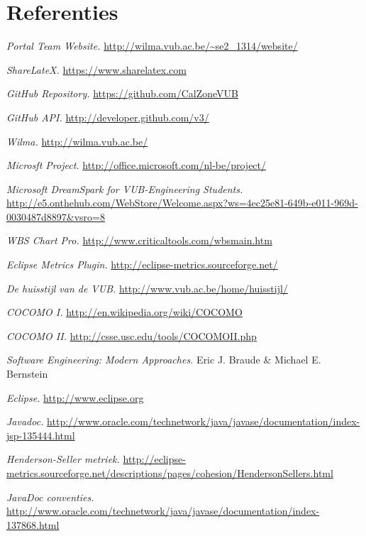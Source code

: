 \chapter{Referenties}
\begingroup
\renewcommand{\chapter}[2]{}%
\begin{thebibliography}{99}

     \emph{Portal Team Website.} \url{http://wilma.vub.ac.be/~se2_1314/website/}
    
     \emph{ShareLateX.} \url{https://www.sharelatex.com}
    
     \emph{GitHub Repository.} \url{https://github.com/CalZoneVUB}
    
     \emph{GitHub API.} \url{http://developer.github.com/v3/}
    
     \emph{Wilma.} \url{http://wilma.vub.ac.be/}
    
     \emph{Microsft Project.} \url{http://office.microsoft.com/nl-be/project/}
    
     \emph{Microsoft DreamSpark for VUB-Engineering Students.} \url{http://e5.onthehub.com/WebStore/Welcome.aspx?ws=4ec25e81-649b-e011-969d-0030487d8897&vsro=8}
    
     \emph{WBS Chart Pro.} \url{http://www.criticaltools.com/wbsmain.htm}
    
     \emph{Eclipse Metrics Plugin.} \url{http://eclipse-metrics.sourceforge.net/}
    
     \emph{De huisstijl van de VUB.} \url{http://www.vub.ac.be/home/huisstijl/}

	 \emph{COCOMO I.} \url{http://en.wikipedia.org/wiki/COCOMO}
	
	 \emph{COCOMO II.} \url{http://csse.usc.edu/tools/COCOMOII.php}
	
	 \emph{Software Engineering: Modern Approaches.} Eric J. Braude \& Michael E. Bernstein

     \emph{Eclipse.} \url{http://www.eclipse.org}
    
     \emph{Javadoc.} \url{http://www.oracle.com/technetwork/java/javase/documentation/index-jsp-135444.html}

		 \emph{Henderson-Seller metriek.} \url{http://eclipse-metrics.sourceforge.net/descriptions/pages/cohesion/HendersonSellers.html}

	 \emph{JavaDoc conventies.} \url{http://www.oracle.com/technetwork/java/javase/documentation/index-137868.html}




\end{thebibliography}


\endgroup